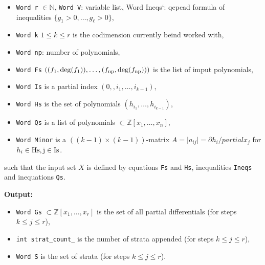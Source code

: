 \documentclass[
]{book}
\providecommand{\tightlist}{%
  \setlength{\itemsep}{0pt}\setlength{\parskip}{0pt}}
\theoremstyle{definition}
\theoremstyle{definition}
\theoremstyle{definition}
\theoremstyle{definition}
\theoremstyle{remark}
\begin{document}
\begin{itemize}
\tightlist
\item
  \texttt{Word\ r} \(\in \mathbb{N}\), \texttt{Word\ V}: variable list, Word Ineqs`: qepcad formula of inequalities \(\{ g_1 > 0, \ldots, g_\ell >0 \}\),
\item
  \texttt{Word\ k} \(1\le k \le r\) is the codimension currently beind worked with,
\item
  \texttt{Word\ np}: number of polynomials,
\item
  \texttt{Word\ Fs} \(((f_1,\deg(f_1)), \ldots, (f_{\rm{np}}, \deg(f_{\rm{np}})))\) is the list of imput polynomials,
\item
  \texttt{Word\ Is} is a partial index \((0,,i_1,\ldots,i_{k-1})\),
\item
  \texttt{Word\ Hs} is the set of polynomials \((h_{i_1},\ldots,h_{i_{k-1}})\),
\item
  \texttt{Word\ Qs} is a list of polynomials \(\subset \mathbb{Z}[x_1,\ldots,x_n]\),
\item
  \texttt{Word\ Minor} is a \(((k-1)\times (k-1))\)-matrix \(A = \vert a_{ij} \vert = \partial h_{i} / partial x_{j}\) for \(h_i \in \rm{Hs}, j \in \rm{Is}\).
\end{itemize}

such that the input set \(X\) is defined by equations \texttt{Fs} and \texttt{Hs}, inequalities \texttt{Ineqs} and inequations \texttt{Qs}.

\textbf{Output:}

\begin{itemize}
\tightlist
\item
  \texttt{Word\ Gs} \(\subset \mathbb{Z}[x_1,\ldots,x_r]\) is the set of all partial differentials (for steps \(k \le j \le r\)),
\item
  \texttt{int\ strat\_count\_} is the number of strata appended (for steps \(k \le j \le r\)),
\item
  \texttt{Word\ S} is the set of strata (for steps \(k \le j \le r\)).
\end{itemize}
\end{document}
